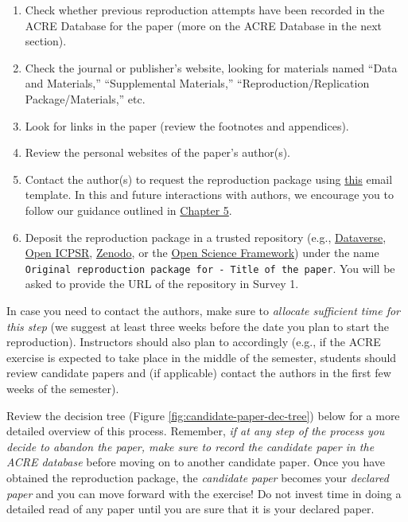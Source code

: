\documentclass[]{book}
\providecommand{\tightlist}{%
  \setlength{\itemsep}{0pt}\setlength{\parskip}{0pt}}
\begin{document}
\begin{enumerate}
\def\labelenumi{\arabic{enumi}.}
\tightlist
\item
  Check whether previous reproduction attempts have been recorded in the ACRE Database for the paper (more on the ACRE Database in the next section).
\item
  Check the journal or publisher's website, looking for materials named ``Data and Materials,'' ``Supplemental Materials,'' ``Reproduction/Replication Package/Materials,'' etc.\\
\item
  Look for links in the paper (review the footnotes and appendices).\\
\item
  Review the personal websites of the paper's author(s).
\item
  Contact the author(s) to request the reproduction package using \href{https://bitss.github.io/ACRE/guidance-for-a-constructive-exchange-between-reproducers-and-original-authors.html\#contacting-the-original-authors-when-there-is-no-reproduction-package}{this} email template. In this and future interactions with authors, we encourage you to follow our guidance outlined in \href{https://bitss.github.io/ACRE/guidance-for-a-constructive-exchange-between-reproducers-and-original-authors.html\#contacting-the-original-authors-when-there-is-no-reproduction-package}{Chapter 5}.
\item
  Deposit the reproduction package in a trusted repository (e.g., \href{https://dataverse.org/}{Dataverse}, \href{https://www.openicpsr.org/openicpsr/}{Open ICPSR}, \href{https://zenodo.org/}{Zenodo}, or the \href{https://osf.io/}{Open Science Framework}) under the name \texttt{Original\ reproduction\ package\ for\ -\ Title\ of\ the\ paper}. You will be asked to provide the URL of the repository in Survey 1.
\end{enumerate}

In case you need to contact the authors, make sure to \emph{allocate sufficient time for this step} (we suggest at least three weeks before the date you plan to start the reproduction). Instructors should also plan to accordingly (e.g., if the ACRE exercise is expected to take place in the middle of the semester, students should review candidate papers and (if applicable) contact the authors in the first few weeks of the semester).

Review the decision tree (Figure \ref{fig:candidate-paper-dec-tree}) below for a more detailed overview of this process. Remember, \emph{if at any step of the process you decide to abandon the paper, make sure to record the candidate paper in the ACRE database} before moving on to another candidate paper. Once you have obtained the reproduction package, the \emph{candidate paper} becomes your \emph{declared paper} and you can move forward with the exercise! Do not invest time in doing a detailed read of any paper until you are sure that it is your declared paper.
\end{document}
